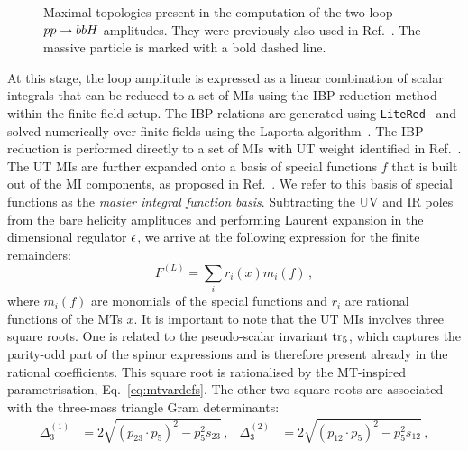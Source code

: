 \documentclass[main.tex]{subfiles}
\begin{document}
\begin{figure}
\begin{subfigure}{0.3\linewidth}
{
        }
    \end{subfigure}
    \caption{Maximal topologies present in the computation of the two-loop $pp \rightarrow b\bar{b}H$ amplitudes. They were previously also used in Ref.~\cite{Badger:2021nhg}. The massive particle is marked with a bold dashed line.}
    \label{fig:Hbbmaxtopos}
\end{figure}

At this stage, the loop amplitude is expressed as a linear combination of scalar integrals that can be reduced to a set of MIs using the IBP reduction method~\cite{Chetyrkin:1981qh} within the finite field setup. The IBP relations are generated using \texttt{LiteRed}~\cite{Lee:2012cn} and solved numerically over finite fields using the Laporta algorithm~\cite{Laporta:2001dd}. The IBP reduction is performed directly to a set of MIs with UT weight identified in Ref.~\cite{Abreu:2020jxa}. The UT MIs are further expanded onto a basis of special functions $f$ that is built out of the MI components, as proposed in Ref.~\cite{Badger:2021nhg}. We refer to this basis of special functions as the \textit{master integral function basis}.
Subtracting the UV and IR poles from the bare helicity amplitudes and performing Laurent expansion in the dimensional regulator $\epsilon$, we arrive at the following expression for the finite remainders:
\begin{equation}
F^{(L)} = \sum_{i} r_i(x) m_i(f)\,,
\label{eq:finrem}
\end{equation}
where $m_i(f)$ are monomials of the special functions and $r_i$ are rational functions of the MTs $x$. It is important to note that the UT MIs involves three square roots. One is related to the pseudo-scalar invariant $\operatorname{\rm tr}_5$, which captures the parity-odd part of the spinor expressions and is therefore present already in the rational coefficients. This square root is rationalised by the MT-inspired parametrisation, Eq.~\ref{eq:mtvardefs}. The other two square roots are associated with the three-mass triangle Gram determinants:
\begin{align}
  \Delta_3^{(1)} &= 2 \sqrt{(p_{23} \cdot p_{5})^2 - p_5^2 s_{23}} \,,&
  \Delta_3^{(2)} &= 2 \sqrt{(p_{12} \cdot p_{5})^2 - p_5^2 s_{12}} \,,
  \label{eq:squareroots}
\end{align}
\end{document}
